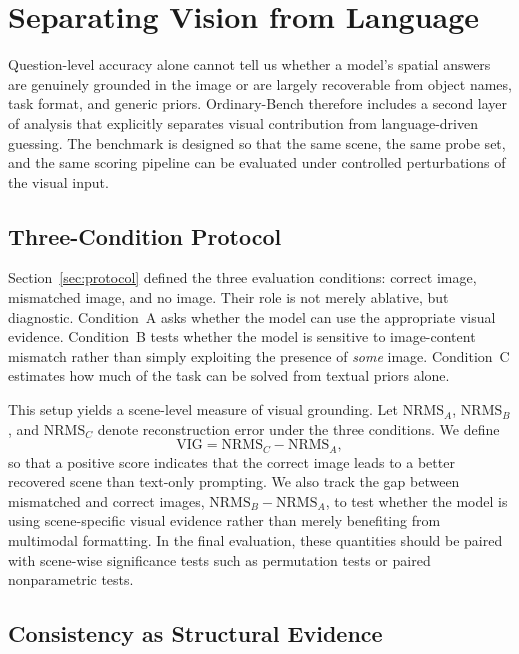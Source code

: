 \section{Separating Vision from Language}
\label{sec:vision-language}

Question-level accuracy alone cannot tell us whether a model's spatial answers are genuinely grounded in the image or are largely recoverable from object names, task format, and generic priors. Ordinary-Bench therefore includes a second layer of analysis that explicitly separates visual contribution from language-driven guessing. The benchmark is designed so that the same scene, the same probe set, and the same scoring pipeline can be evaluated under controlled perturbations of the visual input.

\subsection{Three-Condition Protocol}
\label{sec:three-condition}

Section~\ref{sec:protocol} defined the three evaluation conditions: correct image, mismatched image, and no image. Their role is not merely ablative, but diagnostic. Condition~A asks whether the model can use the appropriate visual evidence. Condition~B tests whether the model is sensitive to image-content mismatch rather than simply exploiting the presence of \emph{some} image. Condition~C estimates how much of the task can be solved from textual priors alone.

This setup yields a scene-level measure of visual grounding. Let $\mathrm{NRMS}_A$, $\mathrm{NRMS}_B$, and $\mathrm{NRMS}_C$ denote reconstruction error under the three conditions. We define
\begin{equation}
  \mathrm{VIG} = \mathrm{NRMS}_C - \mathrm{NRMS}_A,
\end{equation}
so that a positive score indicates that the correct image leads to a better recovered scene than text-only prompting. We also track the gap between mismatched and correct images, $\mathrm{NRMS}_B - \mathrm{NRMS}_A$, to test whether the model is using scene-specific visual evidence rather than merely benefiting from multimodal formatting. In the final evaluation, these quantities should be paired with scene-wise significance tests such as permutation tests or paired nonparametric tests.

\subsection{Consistency as Structural Evidence}
\label{sec:consistency}


